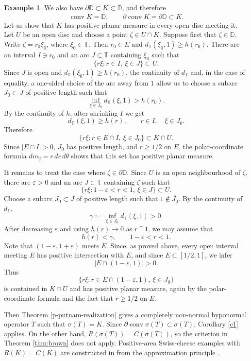 \documentclass[11pt]{amsart}
\numberwithin{equation}{section}
\theoremstyle{definition}
\newtheorem{example}[theorem]{Example}
\theoremstyle{remark}
\DeclareMathOperator{\conv}{conv}
\newcommand{\TT}{\mathbb{T}}
\begin{document}
\begin{example}
We also have $\partial\mathbb D\subset K\subset\overline{\mathbb D}$, and
therefore
\[
    \conv K=\overline{\mathbb D},\qquad
    \partial\conv K=\partial\mathbb D\subset K.
\]
Let us show that $K$ has positive planar measure in every open disc meeting
it. Let $U$ be an open disc and
choose a point $\zeta\in U\cap K$.
Suppose first that $\zeta\in\mathbb D$. Write $\zeta=r_0\xi_0$, where
$\xi_0\in\TT$. Then $r_0\in E$ and $d_{\TT}(\xi_0,1)\ge h(r_0)$. There are
an interval $I\ni r_0$ and an arc $J\subset\TT$ containing $\xi_0$ such that
\[
    \{r\xi: r\in I,\ \xi\in J\}\subset U .
\]
Since $J$ is open and $d_{\TT}(\xi_0,1)\ge h(r_0)$, the continuity of
$d_{\TT}$ and, in the case of equality, a one-sided choice of the arc away
from $1$ allow us to choose a subarc $J_0\subset J$ of positive length such
that
\[
    \inf_{\xi\in J_0} d_{\TT}(\xi,1)>h(r_0).
\]
By the continuity of $h$, after shrinking $I$ we get
\[
    d_{\TT}(\xi,1)\ge h(r),\qquad r\in I,
    \quad \xi\in J_0 .
\]
Therefore
\[
    \{r\xi: r\in E\cap I,\ \xi\in J_0\}\subset K\cap U .
\]
Since $|E\cap I|>0$, $J_0$ has positive length, and $r\ge1/2$ on $E$, the polar-coordinate formula $dm_2=r\,dr\,d\theta$ shows that this set has positive planar measure.

It remains to treat the case where $\zeta\in\partial\mathbb D$. Since $U$ is
an open neighbourhood of $\zeta$, there are $\varepsilon>0$ and an arc
$J\subset\TT$ containing $\zeta$ such that
\[
    \{r\xi: 1-\varepsilon<r<1,
    \ \xi\in J\}\subset U .
\]
Choose a subarc $J_0\subset J$ of positive length such that
$1\notin\overline{J_0}$. By the continuity of $d_{\TT}$,
\[
    \gamma:=\inf_{\xi\in J_0}d_{\TT}(\xi,1)>0 .
\]
After decreasing $\varepsilon$ and using $h(r)\to0$ as $r\uparrow1$, we may
assume that
\[
    h(r)<\gamma,\qquad 1-\varepsilon<r<1 .
\]
Note that $(1-\varepsilon,1+\varepsilon)$ meets $E$. Since, as proved
above, every open interval meeting $E$ has positive intersection with $E$, and
since $E\subset[1/2,1]$, we infer
\[
    |E\cap(1-\varepsilon,1)|>0 .
\]
Thus
\[
    \{r\xi: r\in E\cap(1-\varepsilon,1),\ \xi\in J_0\}
\]
is contained in $K\cap U$ and has positive planar measure, again by the polar-coordinate formula 
and the fact that $r\ge1/2$ on $E$.

Then Theorem \ref{p-putnam-realization} gives a completely non-normal
hyponormal operator $T$ such that $\sigma(T)=K$. Since
$\partial\conv\sigma(T)\subset\sigma(T)$, Corollary \ref{c1} applies. On the
other hand, $R(\sigma(T))=C(\sigma(T))$, so the criterion in Theorem
\ref{thm:brown} does not apply.
Positive-area Swiss-cheese examples with $R(K)=C(K)$ are constructed in
\cite[p.~133]{BR} from the approximation principle \cite[Theorem]{BR}.
\end{example}
\end{document}
